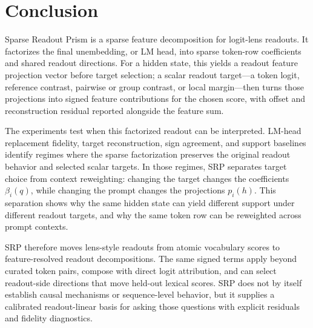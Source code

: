 \section{Conclusion}

Sparse Readout Prism is a sparse feature decomposition for logit-lens readouts.
It factorizes the final unembedding, or LM head, into sparse token-row
coefficients and shared readout directions. For a hidden state, this yields a
readout feature projection vector before target selection; a scalar readout
target---a token logit, reference contrast, pairwise or group contrast, or local
margin---then turns those projections into signed feature contributions for the
chosen score, with offset and reconstruction residual reported alongside the
feature sum.

The experiments test when this factorized readout can be interpreted. LM-head
replacement fidelity, target reconstruction, sign agreement, and support
baselines identify regimes where the sparse factorization preserves the original
readout behavior and selected scalar targets. In those regimes, SRP separates
target choice from context reweighting: changing the target changes the
coefficients \(\beta_i(q)\), while changing the prompt changes the projections
\(p_i(h)\). This separation shows why the same hidden state can yield different
support under different readout targets, and why the same token row can be
reweighted across prompt contexts.

SRP therefore moves lens-style readouts from atomic vocabulary scores to
feature-resolved readout decompositions. The same signed terms apply beyond
curated token pairs, compose with direct logit attribution, and can select
readout-side directions that move held-out lexical scores. SRP does not by
itself establish causal mechanisms or sequence-level behavior, but it supplies a
calibrated readout-linear basis for asking those questions with explicit
residuals and fidelity diagnostics.

